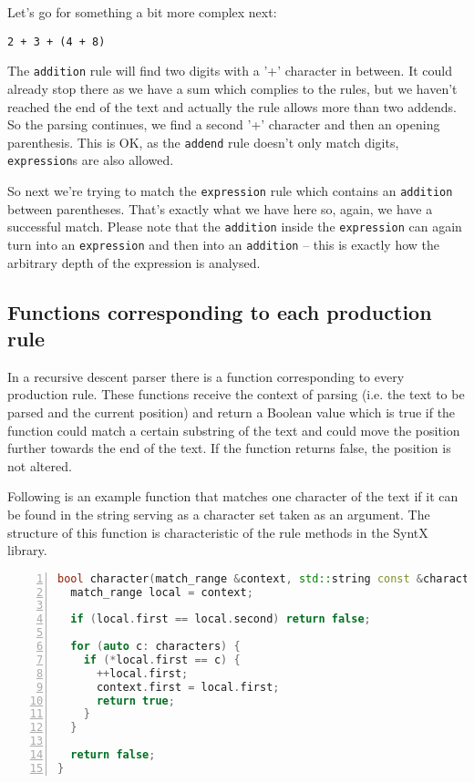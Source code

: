 \documentclass[12pt]{article}
\begin{document}
Let's go for something a bit more complex next:

\begin{center}
	\begin{minipage}[h]{0.2\textwidth}
		\begin{lstlisting}[breaklines=true]
2 + 3 + (4 + 8)
		\end{lstlisting}
	\end{minipage}
\end{center}

The \texttt{addition} rule will find two digits with a '+' character in between. It could already stop there
as we have a sum which complies to the rules, but we haven't reached the end of the text and actually the
rule allows more than two addends. So the parsing continues, we find a second '+' character and then an
opening parenthesis. This is OK, as the \texttt{addend} rule doesn't only match digits, \texttt{expression}s
are also allowed.

So next we're trying to match the \texttt{expression} rule which contains an \texttt{addition} between
parentheses. That's exactly what we have here so, again, we have a successful match. Please note that the
\texttt{addition} inside the \texttt{expression} can again turn into an \texttt{expression} and then into an
\texttt{addition} -- this is exactly how the arbitrary depth of the expression is analysed.

\subsection*{Functions corresponding to each production rule}
In a recursive descent parser there is a function corresponding to every production rule. These functions
receive the context of parsing (i.e. the text to be parsed and the current position) and return a Boolean
value which is true if the function could match a certain substring of the text and could move the position
further towards the end of the text. If the function returns false, the position is not altered.

Following is an example function that matches one character of the text if it can be found in the string
serving as a character set taken as an argument. The structure of this function is characteristic of the
rule methods in the SyntX library.

\begin{center}
	\begin{minipage}[h]{0.8\textwidth}
		\begin{lstlisting}[language=C++, breaklines=true, numbers=left]
bool character(match_range &context, std::string const &characters) {
  match_range local = context;

  if (local.first == local.second) return false;

  for (auto c: characters) {
    if (*local.first == c) {
      ++local.first;
      context.first = local.first;
      return true;
    }
  }

  return false;
}
		\end{lstlisting}
	\end{minipage}
\end{center}
\end{document}
